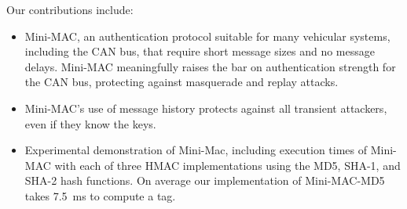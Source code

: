 Our contributions include:
\begin{itemize}

\item Mini-MAC, an authentication protocol suitable for many vehicular systems, including the CAN bus, 
that require short message sizes and no message delays.
Mini-MAC meaningfully raises the bar on authentication strength for the CAN bus, protecting against
masquerade and replay attacks.

\item Mini-MAC's use of message history protects against all transient attackers, 
even if they know the keys.

\item Experimental demonstration of Mini-Mac, including execution times of Mini-MAC 
with each of three HMAC implementations using the MD5, SHA-1, and SHA-2 hash functions. 
On average our implementation of Mini-MAC-MD5 takes 7.5~ms to compute a tag.

\end{itemize}
